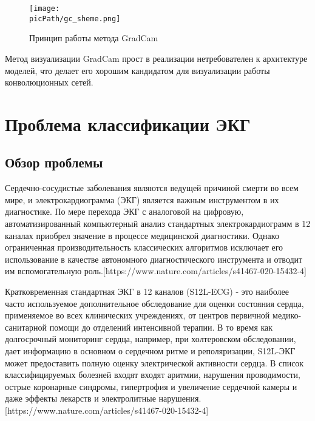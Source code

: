 \documentclass[oneside,final,14pt]{extreport}
\newcommand{\picPath}{img}
\begin{document}
\begin{figure}[H]
\begin{center}
\texttt{[image: \\picPath/gc\_sheme.png]}
\end{center}
  \caption{Принцип работы метода GradCam}
  \label{pic:gc_cat_and_dog}
\end{figure}
Метод визуализации GradCam прост в реализации нетребователен к архитектуре моделей, что делает его хорошим кандидатом для визуализации работы конволюционных сетей.

\chapter{Проблема классификации ЭКГ}
\section{Обзор проблемы}
Сердечно-сосудистые заболевания являются ведущей причиной смерти во всем мире, и электрокардиограмма (ЭКГ) является важным инструментом в их диагностике. По мере перехода ЭКГ с аналоговой на цифровую, автоматизированный компьютерный анализ стандартных электрокардиограмм в 12 каналах приобрел значение в процессе медицинской диагностики. Однако ограниченная производительность классических алгоритмов исключает его использование в качестве автономного диагностического инструмента и отводит им вспомогательную роль.[https://www.nature.com/articles/s41467-020-15432-4]

Кратковременная стандартная ЭКГ в 12 каналов (S12L-ECG) - это наиболее часто используемое дополнительное обследование для оценки состояния сердца, применяемое во всех клинических учреждениях, от центров первичной медико-санитарной помощи до отделений интенсивной терапии. В то время как долгосрочный мониторинг сердца, например, при холтеровском обследовании, дает информацию в основном о сердечном ритме и реполяризации, S12L-ЭКГ может предоставить полную оценку электрической активности сердца. В список классифицируемых болезней входят входят аритмии, нарушения проводимости, острые коронарные синдромы, гипертрофия и увеличение сердечной камеры и даже эффекты лекарств и электролитные нарушения.
[https://www.nature.com/articles/s41467-020-15432-4]
\end{document}
